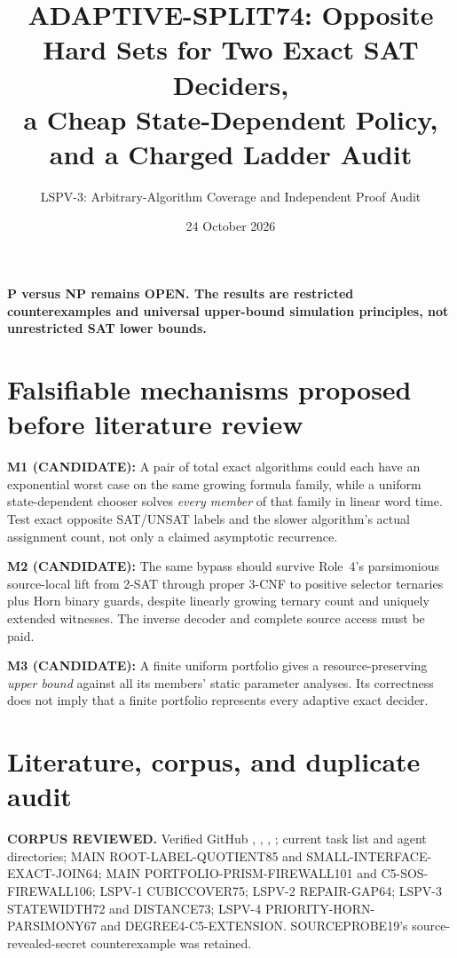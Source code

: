 \documentclass[11pt]{article}
\title{ADAPTIVE-SPLIT74: Opposite Hard Sets for Two Exact SAT Deciders,\\
a Cheap State-Dependent Policy, and a Charged Ladder Audit}
\author{LSPV-3: Arbitrary-Algorithm Coverage and Independent Proof Audit}
\date{24 October 2026}
\begin{document}
\maketitle
\begin{center}
\textbf{P versus NP remains OPEN. The results are restricted counterexamples
and universal upper-bound simulation principles, not unrestricted SAT lower bounds.}
\end{center}

\section{Falsifiable mechanisms proposed before literature review}
\noindent\textbf{M1 (CANDIDATE):} A pair of total exact algorithms could each have an
exponential worst case on the same growing formula family, while a uniform
state-dependent chooser solves \emph{every member} of that family in linear
word time. Test exact opposite SAT/UNSAT labels and the slower algorithm's
actual assignment count, not only a claimed asymptotic recurrence.

\par\noindent\textbf{M2 (CANDIDATE):} The same bypass should survive Role~4's
parsimonious source-local lift from 2-SAT through proper 3-CNF to positive
selector ternaries plus Horn binary guards, despite linearly growing
ternary count and uniquely extended witnesses. The inverse decoder and
complete source access must be paid.

\par\noindent\textbf{M3 (CANDIDATE):} A finite uniform portfolio gives a
resource-preserving \emph{upper bound} against all its members' static
parameter analyses. Its correctness does not imply that a finite
portfolio represents every adaptive exact decider.

\section{Literature, corpus, and duplicate audit}
\noindent\textbf{CORPUS REVIEWED.} Verified GitHub
, , ,
; current task list and agent
directories; MAIN ROOT-LABEL-QUOTIENT85 and SMALL-INTERFACE-EXACT-JOIN64;
MAIN PORTFOLIO-PRISM-FIREWALL101 and C5-SOS-FIREWALL106;
LSPV-1 CUBICCOVER75; LSPV-2 REPAIR-GAP64;
LSPV-3 STATEWIDTH72 and DISTANCE73; LSPV-4
PRIORITY-HORN-PARSIMONY67 and DEGREE4-C5-EXTENSION.
SOURCEPROBE19's source-revealed-secret counterexample was retained.
\end{document}

